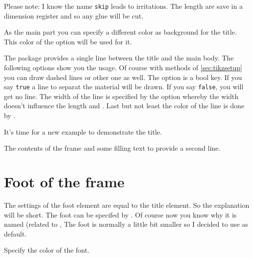 \documentclass[openany,12pt,tocdepth=3]{ltx-md}
\begin{document}
\faArrowRight Please note:  I know the name \texttt{skip} leads to irritations. The length are save in a
dimension register and so any glue will be cut.

As the main part you can specify a different color as background for
the title. This color of the option  will be used for it.


The package  provides a single line between the title and the main body.
The following options show you the usage. Of course with methods of
\autoref{sec:tikzsetup} you can draw dashed lines or other one as well.
The option  is a bool key. If you say \texttt{true} a line to separat
the material will be drawn. If you say \texttt{false}, you will get no line.
The width of the line is specified by the option  whereby
the width doesn't influence the length  and .
Last but not least the color of the line is done by .

It's time for a new example to demonstrate the title.

\begin{ltxexample}[caption={Example title part},label=title,result=true]
 \begin{xframed}[title-bg-color=brown!30,%
   line-width=2pt,line-color=brown!60,
  first-title={This is the title of the frame},
   margin=1.5cm,bg-color=yellow!20, ]
   The contents of the frame and some filling text to 
  provide a second line.
 \end{xframed}
\end{ltxexample}



\section{Foot of the frame}\label{sec:element-lastfoot}
The settings of the foot element are equal to the title element. So 
the explanation will be short. 
The foot can be specifed by . Of course now you
know why it is named  (related to ,
The foot is normally a little bit smaller so I decided to use  as
default.


Specify the color of the font.
\end{document}
